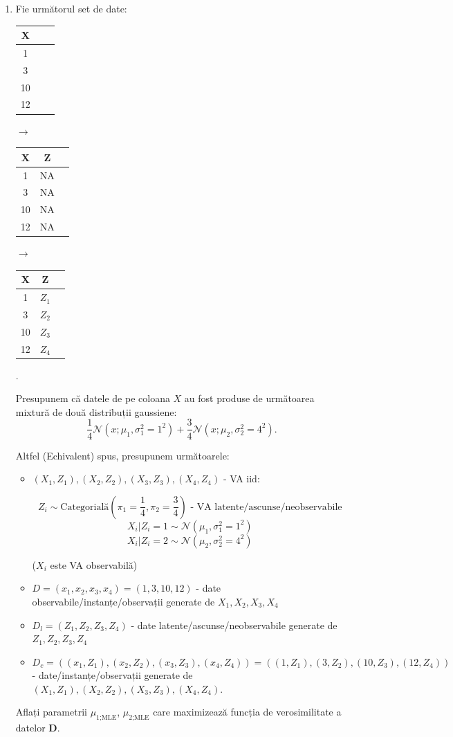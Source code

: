\documentclass[12pt]{article}
\begin{document}
\begin{enumerate}
		\begin{enumerate}
			\item Fie următorul set de date: 
			\begin{tabular}{ |c|c|c| } 
				\hline
				X \\ 
				\hline
				1 \\ 
				3\\ 
				10\\
				12\\
				\hline
			\end{tabular} $\rightarrow$ \begin{tabular}{ |c|c|c| } 
			\hline
			X & Z\\ 
			\hline
			1 & NA \\ 
			3 & NA\\ 
			10 & NA\\
			12 & NA\\
			\hline
		\end{tabular} $\rightarrow$ \begin{tabular}{ |c|c|c| } 
		\hline
		X & Z\\ 
		\hline
		1 & $Z_1$ \\ 
		3 & $Z_2$\\ 
		10 & $Z_3$\\
		12 & $Z_4$\\
		\hline
	\end{tabular}. 
			
			Presupunem că datele de pe coloana $X$ au fost produse de următoarea mixtură de două distribuții gaussiene:
			$$\dfrac{1}{4}\mathcal{N}(x;\mu_1,\sigma_1^2=1^2) + \dfrac{3}{4}\mathcal{N}(x;\mu_2,\sigma_2^2=4^2).$$
			
			Altfel (Echivalent) spus, presupunem următoarele:
			\begin{itemize}
				\item $(X_1,Z_1), (X_2,Z_2), (X_3,Z_3), (X_4,Z_4)$ - VA iid: 
				
				$$Z_i \sim \text{Categorială}\left(\pi_1=\dfrac{1}{4},\pi_2=\dfrac{3}{4}\right)\text{ - VA latente/ascunse/neobservabile}$$
				$$X_i|Z_i = 1 \sim \mathcal{N}(\mu_1,\sigma_1^2 = 1^2)$$
				$$X_i|Z_i = 2 \sim \mathcal{N}(\mu_2,\sigma_2^2 = 4^2)$$
				\begin{center}
					($X_i$ este VA observabilă)
				\end{center}
				\item $D = (x_1,x_2,x_3,x_4) = (1,3,10,12)$ - date observabile/instanțe/observații generate de $X_1,X_2,X_3,X_4$
				\item $D_l = (Z_1,Z_2,Z_3,Z_4)$ - date latente/ascunse/neobservabile generate de $Z_1, Z_2, Z_3, Z_4$
				\item $D_c=((x_1,Z_1),(x_2,Z_2),(x_3,Z_3),(x_4,Z_4)) = ((1,Z_1),(3,Z_2),(10,Z_3),(12,Z_4))$ - date/instanțe/observații generate de $(X_1,Z_1),(X_2,Z_2),(X_3,Z_3),(X_4,Z_4)$.
			\end{itemize}
			Aflați parametrii $\mu_\text{1;MLE}$, $\mu_\text{2;MLE}$ care maximizează funcția de verosimilitate a datelor \textbf{D}.
			

\end{enumerate}
\end{enumerate}
\end{document}
